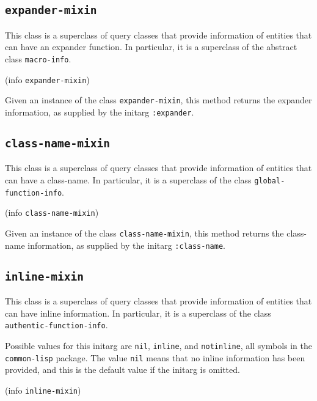 \subsection{\texttt{expander-mixin}}
\label{sec-expander-mixin}

This class is a superclass of query classes that provide information
of entities that can have an expander function.  In particular, it is
a superclass of the abstract class \texttt{macro-info}.


 {(info {\tt expander-mixin})}

Given an instance of the class \texttt{expander-mixin}, this method
returns the expander information, as supplied by the initarg
\texttt{:expander}.

\subsection{\texttt{class-name-mixin}}
\label{sec-class-name-mixin}

This class is a superclass of query classes that provide information
of entities that can have a class-name.  In particular, it is a
superclass of the class \texttt{global-function-info}.


 {(info {\tt class-name-mixin})}

Given an instance of the class \texttt{class-name-mixin}, this method
returns the class-name information, as supplied by the initarg
\texttt{:class-name}.

\subsection{\texttt{inline-mixin}}
\label{sec-inline-mixin}

This class is a superclass of query classes that provide information
of entities that can have inline information.  In particular, it is a
superclass of the class \texttt{authentic-function-info}.


Possible values for this initarg are \texttt{nil}, \texttt{inline},
and \texttt{notinline}, all symbols in the \texttt{common-lisp}
package.  The value \texttt{nil} means that no inline information has
been provided, and this is the default value if the initarg is omitted.

 {(info {\tt inline-mixin})}

